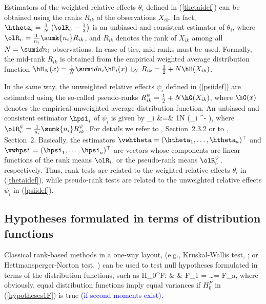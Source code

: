 Estimators of the weighted relative effects $\theta_i$ defined in 
(\ref{thetaidef}) can be obtained using the ranks $R_{ik}$ of the observations 
$X_{ik}$. In fact, $\htheta_i=\frac1N \left( \olR_{i \cdot} - \frac12 \right)$ is an 
unbiased and consistent estimator of $\theta_i$, where 
$\olR_{i \cdot} = \frac1{n_i} \sumk {n_i} R_{ik}$, and $R_{ik}$ denotes the rank 
of $X_{ik}$ among all $N=\sumi d n_i$ observations. In case of ties, mid-ranks 
must be used. Formally, the mid-rank $R_{ik}$ is obtained from the empirical 
weighted average distribution function $\hH_N(x) =\frac1N \sumi d n_i \hF_i(x)$ 
by $R_{ik} = \frac12 + N \hH(X_{ik})$. 

In the same way, the unweighted relative effects $\psi_i$ defined in 
(\ref{psiidef}) are estimated using the so-called pseudo-ranks $R_{ik}^\psi = 
\frac12 + N \hG(X_{ik})$, where $\hG(x)$ denotes the empirical unweighted 
average distribution function. An unbiased and consistent estimator $\hpsi_i$ 
of $\psi_i$ is given by 
\bqan 
 \hpsi_i &=& \frac1N \left(\olR_{i \cdot}^\psi -  \right), 
             \label{psihdef}
\eqan 
where $\olR_{i \cdot}^\psi = \frac1{n_i} \sumk {n_i} R_{ik}^\psi$. For details 
we refer to \cite{brunner2019rank}, Section~2.3.2 or to \cite{happ2020pseudo}, 
Section~2. Basically, the estimators $\vwhtheta = (\htheta_1, \ldots, 
\htheta_a)^\top$ and $\vwhpsi = (\hpsi_1, \ldots, \hpsi_a)^\top$ are vectors whose
components are linear functions of the rank means $\olR_{i \cdot}$ 
or the pseudo-rank means $\olR_{i \cdot}^\psi$, respectively. Thus, rank tests 
are related to the weighted relative effects $\theta_i$ in (\ref{thetaidef}), 
while pseudo-rank tests are related to the unweighted relative effects $\psi_i$ 
in (\ref{psiidef}).


\subsection{Hypotheses formulated in terms of distribution functions} \label{hypF}

Classical rank-based methods in a one-way layout, (e.g., Kruskal-Wallis test, 
\cite{kruskal1952nonparametric, kruskal1952use}; or Hettmansperger-Norton test, \cite{hettmansperger1987tests}) 
can be used to test null hypotheses formulated in terms of the distribution functions, such as 
\bqan 
H_0^F: & & F_1 = \ldots = F_a,  \label{hypotheses1F}
\eqan
where obviously, equal distribution functions imply equal variances if $H_0^F$ 
in (\ref{hypotheses1F}) is true \textcolor{blue}{(if second moments exist)}.

